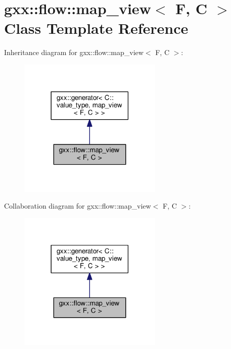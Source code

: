 \hypertarget{classgxx_1_1flow_1_1map__view}{}\section{gxx\+:\+:flow\+:\+:map\+\_\+view$<$ F, C $>$ Class Template Reference}
\label{classgxx_1_1flow_1_1map__view}


Inheritance diagram for gxx\+:\+:flow\+:\+:map\+\_\+view$<$ F, C $>$\+:
\nopagebreak
\begin{figure}[H]
\begin{center}
\leavevmode
\includegraphics[width=194pt]{classgxx_1_1flow_1_1map__view__inherit__graph}
\end{center}
\end{figure}


Collaboration diagram for gxx\+:\+:flow\+:\+:map\+\_\+view$<$ F, C $>$\+:
\nopagebreak
\begin{figure}[H]
\begin{center}
\leavevmode
\includegraphics[width=194pt]{classgxx_1_1flow_1_1map__view__coll__graph}
\end{center}
\end{figure}
